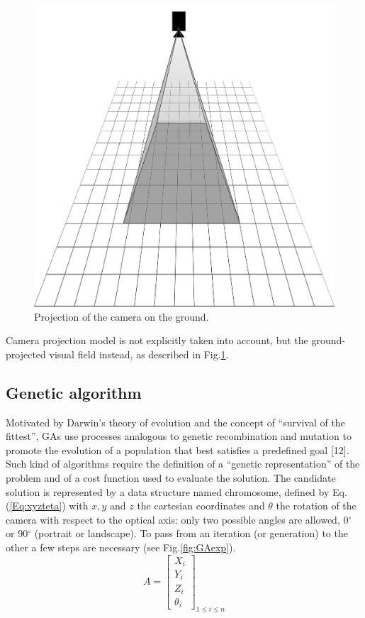 \begin{figure}[!htb]
  \includegraphics[width=\linewidth]{figures/Camera.jpg}
  \caption{Projection of the camera on the ground.}\label{fig:cam_proj}
  \endminipage\hfill
\end{figure}

Camera projection model is not explicitly taken into account, but the ground-projected visual field instead, as described in Fig.\ref{fig:cam_proj}.

\subsection{Genetic algorithm }
Motivated by Darwin's theory of evolution and the concept of “survival of the fittest”, GAs use processes analogous to genetic recombination and mutation to promote the evolution of a population that best satisfies a predefined goal [12]. Such kind of algorithms require the definition of a “genetic representation” of the problem and of a cost function used to evaluate the solution. The candidate solution is represented by a data structure named chromosome, defined by Eq.(\ref{Eq:xyzteta}) with $x,y$ and $z$ the cartesian coordinates and $\theta$ the rotation of the camera with respect to the optical axis: only  two possible angles are allowed, 0$^{\circ}$  or 90$^{\circ}$ (portrait or landscape). To pass from an iteration (or generation) to the other a few steps are necessary (see Fig.\ref{fig:GAexp}).
\begin{equation}\label{Eq:xyzteta}
     A=\begin{bmatrix}
         X_{i} \\
         Y_{i} \\
         Z_{i}\\
         \theta_{i}
        \end{bmatrix}_{1 \leq i \leq n}
  \end{equation}

